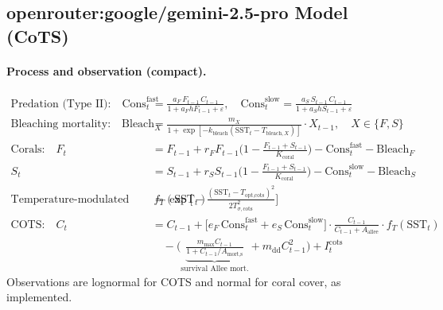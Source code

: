 \subsection{openrouter:google/gemini-2.5-pro Model (CoTS)}
\paragraph{Process and observation (compact).}
\begin{align}
\text{Predation (Type II):}\quad
\mathrm{Cons}^{\text{fast}}_t &= \frac{a_F\,F_{t-1}\,C_{t-1}}{1 + a_F h F_{t-1} + \varepsilon},\quad
\mathrm{Cons}^{\text{slow}}_t = \frac{a_S\,S_{t-1}\,C_{t-1}}{1 + a_S h S_{t-1} + \varepsilon} \\[4pt]
\text{Bleaching mortality:}\quad
\mathrm{Bleach}_X &= \frac{m_X}{1 + \exp[-k_{\text{bleach}}(\mathrm{SST}_t - T_{\text{bleach},X})]}\cdot X_{t-1},\quad X\in\{F,S\} \\[4pt]
\text{Corals:}\quad F_t &= F_{t-1} + r_F F_{t-1}\Big(1 - \frac{F_{t-1}+S_{t-1}}{K_{\text{coral}}}\Big) - \mathrm{Cons}^{\text{fast}}_t - \mathrm{Bleach}_F \\
S_t &= S_{t-1} + r_S S_{t-1}\Big(1 - \frac{F_{t-1}+S_{t-1}}{K_{\text{coral}}}\Big) - \mathrm{Cons}^{\text{slow}}_t - \mathrm{Bleach}_S \\[4pt]
\text{Temperature-modulated reproduction:}\quad
f_T(\mathrm{SST}_t) &= \exp\!\Big[-\frac{(\mathrm{SST}_t - T_{\text{opt,cots}})^2}{2T_{\sigma,\text{cots}}^2}\Big] \\[4pt]
\text{COTS:}\quad
C_t &= C_{t-1} + \Big[e_F\,\mathrm{Cons}^{\text{fast}}_t + e_S\,\mathrm{Cons}^{\text{slow}}_t\Big]\cdot \frac{C_{t-1}}{C_{t-1}+A_{\text{allee}}}\cdot f_T(\mathrm{SST}_t) \\
&\quad - \Big(\underbrace{\frac{m_{\max}C_{t-1}}{1 + C_{t-1}/A_{\text{mort,s}}}}_{\text{survival Allee mort.}} + m_{\text{dd}} C_{t-1}^2\Big) + I^{\text{cots}}_t
\end{align}
Observations are lognormal for COTS and normal for coral cover, as implemented.


